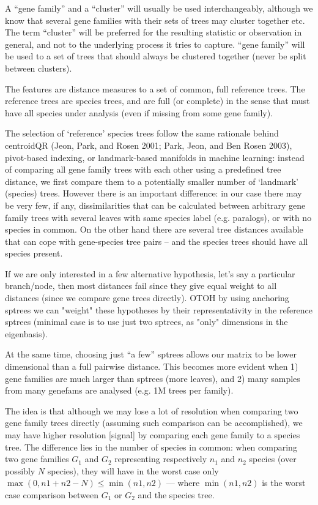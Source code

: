 A “gene family” and a “cluster” will usually be used interchangeably, although we know that several gene families with
their sets of trees may cluster together etc. The term “cluster” will be preferred for the resulting statistic or
observation in general, and not to the underlying process it tries to capture. “gene family” will be used to a set of
trees that should always be clustered together (never be split between clusters).

The features are distance measures to a set of common, full reference trees. The reference trees are species trees, and
are full (or complete) in the sense that must have all species under analysis (even if missing from some gene family).

The selection of ‘reference’ species trees follow the same rationale behind centroidQR (Jeon, Park, and Rosen 2001;
Park, Jeon, and Ben Rosen 2003), pivot-based indexing, or landmark-based manifolds in machine learning: instead of
comparing all gene family trees with each other using a predefined tree distance, we first compare them to a potentially
smaller number of ‘landmark’ (species) trees. However there is an important difference: in our case there may be very
few, if any, dissimilarities that can be calculated between arbitrary gene family trees with several leaves with same
species label (e.g. paralogs), or with no species in common. On the other hand there are several tree distances
available that can cope with gene-species tree pairs – and the species trees should have all species present.

If we are only interested in a few alternative hypothesis, let’s say a particular branch/node, then most distances fail
since they give equal weight to all distances (since we compare gene trees directly). OTOH by using anchoring sptrees we
can "weight" these hypotheses by their representativity in the reference sptrees (minimal case is to use just two
sptrees, as "only" dimensions in the eigenbasis).

At the same time, choosing just ``a few'' sptrees allows our matrix to be lower dimensional than a full pairwise distance.
This becomes more evident when 1) gene families are much larger than sptrees (more leaves), and 2) many samples from
many genefams are analysed (e.g. 1M trees per family).

The idea is that although we may lose a lot of resolution when comparing two gene family trees directly (assuming such
comparison can be accomplished), we may have higher resolution [signal] by comparing each gene family to a species tree.
The difference lies in the number of species in common: when comparing two gene families $G_1$ and $G_2$ representing
respectively $n_1$ and $n_2$ species (over possibly $N$ species), they will have in the worst case only
$\max\left(0,n1+n2-N\right) \leq \min\left(n1,n2\right)$  --- where $\min\left(n1,n2\right)$ 
is the worst case comparison between $G_1$ or $G_2$ and the species tree.



